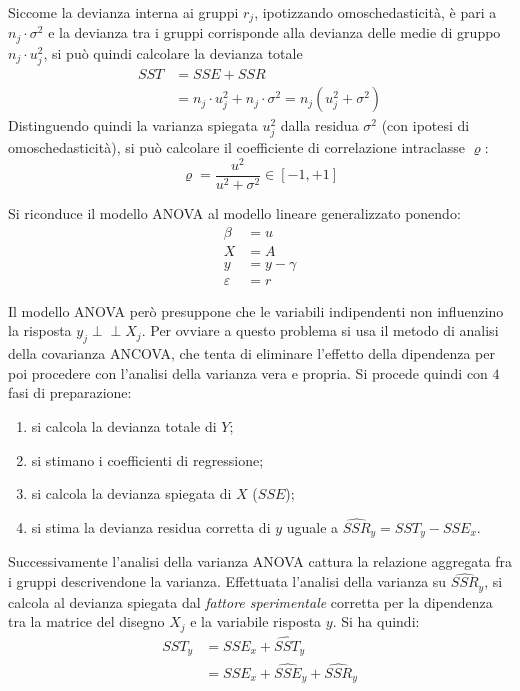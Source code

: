\documentclass[a4page, 11pt]{article} %
\def\indep{\perp \!\!\! \perp }   %
\begin{document}
Siccome la devianza interna ai gruppi $r_j$, ipotizzando omoschedasticità, è pari a $n_j \cdot \sigma^2$ e la devianza tra i gruppi corrisponde alla devianza delle medie di gruppo $n_j \cdot u_j^2$, si può quindi calcolare la devianza totale
\begin{align*}
  SST &= SSE + SSR \\
      &= n_j \cdot u_j^2 + n_j \cdot \sigma^2 = n_j(u_j^2 + \sigma^2)
\end{align*}
Distinguendo quindi la varianza spiegata $u_j^2$ dalla residua $\sigma^2$ (con ipotesi di omoschedasticità), si può calcolare il coefficiente di correlazione intraclasse $\varrho$:
\begin{equation*}
\varrho = \frac{u^2}{u^2 + \sigma^2} \in [-1, +1]
\end{equation*}

Si riconduce il modello ANOVA al modello lineare generalizzato ponendo:
\begin{align*}
  \beta &= u \\
  X &= A \\
  y &= y - \gamma \\
  \varepsilon &= r
\end{align*}

Il modello ANOVA però presuppone che le variabili indipendenti non influenzino la risposta $y_j \indep X_j$.
Per ovviare a questo problema si usa il metodo di analisi della covarianza ANCOVA, che tenta di eliminare l'effetto della dipendenza per poi procedere con l'analisi della varianza vera e propria.
Si procede quindi con $4$ fasi di preparazione:
\begin{enumerate}[noitemsep]
\item si calcola la devianza totale di $Y$;
\item si stimano i coefficienti di regressione;
\item si calcola la devianza spiegata di $X$ ($SSE$);
\item si stima la devianza residua corretta di $y$ uguale a $\widehat{SSR}_{y}=SST_y - SSE_x$.
\end{enumerate}
Successivamente l’analisi della varianza ANOVA cattura la relazione aggregata fra i gruppi descrivendone la varianza.
Effettuata l'analisi della varianza su $\widehat{SSR}_{y}$, si calcola al devianza spiegata dal \textit{fattore sperimentale} corretta per la dipendenza tra la matrice del disegno $X_j$ e la variabile risposta $y$.
Si ha quindi:
\begin{align*}
  SST_y &= SSE_x + \widehat{SST}_y \\
        &= SSE_x + \widehat{SSE}_y + \widehat{SSR}_y
\end{align*}
\end{document}
